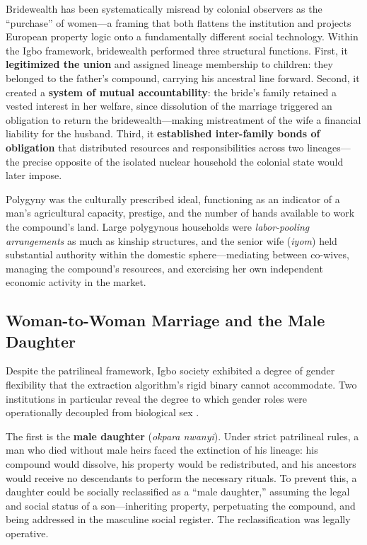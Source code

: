 Bridewealth has been systematically misread by colonial observers as the ``purchase'' of women---a framing that both flattens the institution and projects European property logic onto a fundamentally different social technology. Within the Igbo framework, bridewealth performed three structural functions. First, it \textbf{legitimized the union} and assigned lineage membership to children: they belonged to the father's compound, carrying his ancestral line forward. Second, it created a \textbf{system of mutual accountability}: the bride's family retained a vested interest in her welfare, since dissolution of the marriage triggered an obligation to return the bridewealth---making mistreatment of the wife a financial liability for the husband. Third, it \textbf{established inter-family bonds of obligation} that distributed resources and responsibilities across two lineages---the precise opposite of the isolated nuclear household the colonial state would later impose.

Polygyny was the culturally prescribed ideal, functioning as an indicator of a man's agricultural capacity, prestige, and the number of hands available to work the compound's land. Large polygynous households were \textit{labor-pooling arrangements} as much as kinship structures, and the senior wife (\textit{iyom}) held substantial authority within the domestic sphere---mediating between co-wives, managing the compound's resources, and exercising her own independent economic activity in the market.

\subsection{Woman-to-Woman Marriage and the Male Daughter}
\label{subsec:male_daughter}
\label{sec:igbo_w2w}

Despite the patrilineal framework, Igbo society exhibited a degree of gender flexibility that the extraction algorithm's rigid binary cannot accommodate. Two institutions in particular reveal the degree to which gender roles were operationally decoupled from biological sex \cite{w2w_oxford, w2w_republic, w2w_rustin}.

The first is the \textbf{male daughter} (\textit{okpara nwanyi}). Under strict patrilineal rules, a man who died without male heirs faced the extinction of his lineage: his compound would dissolve, his property would be redistributed, and his ancestors would receive no descendants to perform the necessary rituals. To prevent this, a daughter could be socially reclassified as a ``male daughter,'' assuming the legal and social status of a son---inheriting property, perpetuating the compound, and being addressed in the masculine social register. The reclassification was legally operative.

